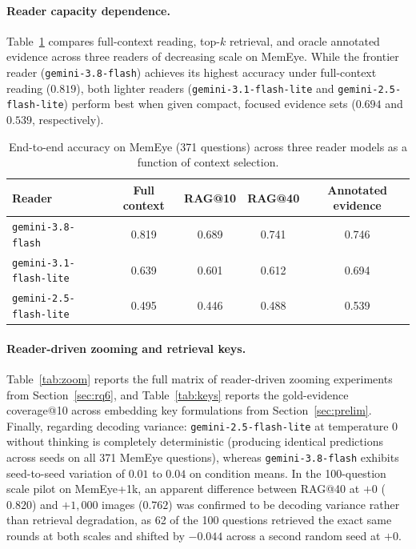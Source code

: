 \documentclass[10pt]{article}
\begin{document}
\paragraph{Reader capacity dependence.} Table~\ref{tab:reader} compares full-context reading, top-$k$ retrieval, and oracle annotated evidence across three readers of decreasing scale on MemEye. While the frontier reader (\texttt{gemini-3.8-flash}) achieves its highest accuracy under full-context reading ($0.819$), both lighter readers (\texttt{gemini-3.1-flash-lite} and \texttt{gemini-2.5-flash-lite}) perform best when given compact, focused evidence sets ($0.694$ and $0.539$, respectively).

\begin{table}[h]
\centering
\caption{End-to-end accuracy on MemEye (371 questions) across three reader models as a function of context selection.}
\label{tab:reader}
\small
\begin{tabular}{lcccc}
\toprule
Reader & Full context & RAG@10 & RAG@40 & Annotated evidence \\
\midrule
\texttt{gemini-3.8-flash} & 0.819 & 0.689 & 0.741 & 0.746 \\
\texttt{gemini-3.1-flash-lite} & 0.639 & 0.601 & 0.612 & 0.694 \\
\texttt{gemini-2.5-flash-lite} & 0.495 & 0.446 & 0.488 & 0.539 \\
\bottomrule
\end{tabular}
\end{table}

\paragraph{Reader-driven zooming and retrieval keys.} Table~\ref{tab:zoom} reports the full matrix of reader-driven zooming experiments from Section~\ref{sec:rq6}, and Table~\ref{tab:keys} reports the gold-evidence coverage@10 across embedding key formulations from Section~\ref{sec:prelim}. Finally, regarding decoding variance: \texttt{gemini-2.5-flash-lite} at temperature 0 without thinking is completely deterministic (producing identical predictions across seeds on all 371 MemEye questions), whereas \texttt{gemini-3.8-flash} exhibits seed-to-seed variation of $0.01$ to $0.04$ on condition means. In the 100-question scale pilot on MemEye+1k, an apparent difference between RAG@40 at $+0$ ($0.820$) and $+1,000$ images ($0.762$) was confirmed to be decoding variance rather than retrieval degradation, as 62 of the 100 questions retrieved the exact same rounds at both scales and shifted by $-0.044$ across a second random seed at $+0$.
\end{document}
